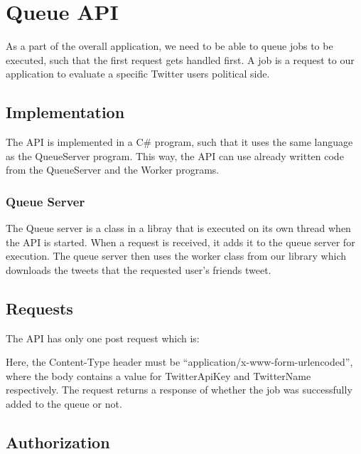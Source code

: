 \chapter{Queue \ac{API}}
As a part of the overall application, we need to be able to queue jobs to be
executed, such that the first request gets handled first. A job is a request to
our application to evaluate a specific Twitter users political side.

\section{Implementation}
The \ac{API} is implemented in a C\# program, such that it uses the same
language as the QueueServer program. This way, the \ac{API} can use already
written code from the QueueServer and the Worker programs.

\subsection{Queue Server}
The Queue server is a class in a libray that is executed on its own thread when
the \ac{API} is started. When a request is received, it adds it to the queue
server for execution. The queue server then uses the worker class from our library which
downloads the tweets that the requested user's friends tweet. 


\section{Requests}
The \ac{API} has only one post request which is: \nl

\nl

Here, the Content-Type header must be ``application/x-www-form-urlencoded'',
where the body contains a value for TwitterApiKey and TwitterName
respectively.
The request returns a response of whether the job was successfully added to the
queue or not.

\section{Authorization}



